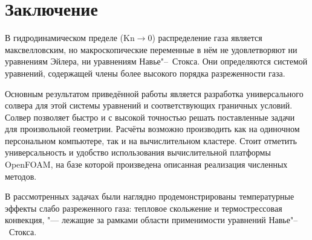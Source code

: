 \documentclass[english,russian,a4paper,10pt]{article}
\newcommand{\Kn}{\mathrm{Kn}}
\begin{document}
\section{Заключение}

В гидродинамическом пределе (\(\Kn\to0\)) распределение газа является максвелловским,
но макроскопические переменные в нём не удовлетворяют ни уравнениям Эйлера,
ни уравнениям Навье"--~Стокса. Они определяются системой уравнений,
содержащей члены более высокого порядка разреженности газа.

Основным результатом приведённой работы является разработка универсального солвера
для этой системы уравнений и соответствующих граничных условий.
Солвер позволяет быстро и с высокой точностью решать поставленные задачи для произвольной геометрии.
Расчёты возможно производить как на одиночном персональном компьютере, так и на вычислительном кластере.
Стоит отметить универсальность и удобство использования вычислительной платформы OpenFOAM\textregistered{},
на базе которой произведена описанная реализация численных методов.

В рассмотренных задачах были наглядно продемонстрированы температурные эффекты слабо разреженного газа:
тепловое скольжение и термострессовая конвекция, "--- лежащие за рамками области применимости
уравнений Навье"--~Стокса.

\printbibliography
\end{document}
